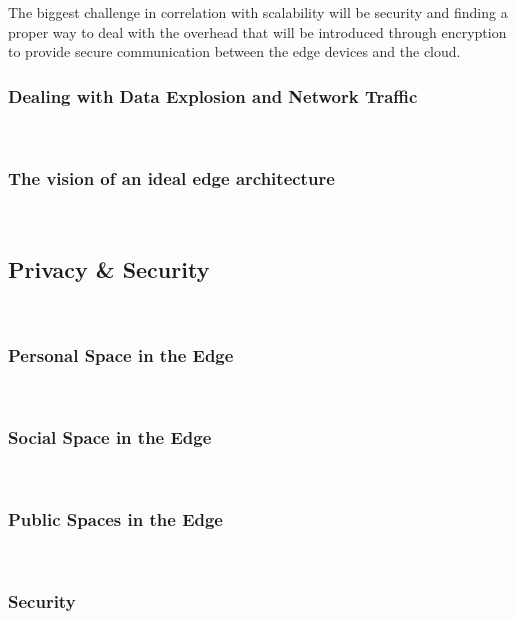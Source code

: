 The biggest challenge in correlation with scalability will be security and finding a proper way to deal with the overhead that will be introduced through encryption to provide secure communication between the edge devices and the cloud.


\subsubsection{Dealing with Data Explosion and Network Traffic}\hspace*{\fill} \\


\subsubsection{The vision of an ideal edge architecture}\hspace*{\fill} \\

\subsection{Privacy \& Security}
\\

\subsubsection{Personal Space in the Edge}\hspace*{\fill} \\

\subsubsection{Social Space in the Edge}\hspace*{\fill} \\

\subsubsection{Public Spaces in the Edge}\hspace*{\fill} \\

\subsubsection{Security}\hspace*{\fill} \\

